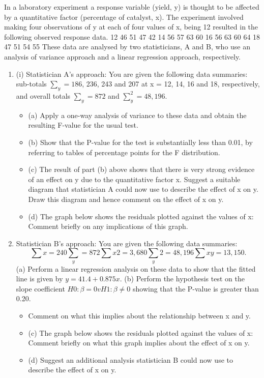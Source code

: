 \documentclass[a4paper,12pt]{article}
\begin{document}

In a laboratory experiment a response variable (yield, y) is thought to be affected by a
quantitative factor (percentage of catalyst, x). The experiment involved making four
observations of y at each of four values of x, being 12%
resulted in the following observed response data.
12%
46
51
47
42
14%
56
57
63
60
16%
56
63
60
64
18%
47
51
54
55
These data are analysed by two statisticians, A and B, who use an analysis of variance
approach and a linear regression approach, respectively.
\begin{enumerate}
\item (i)
Statistician A’s approach:
You are given the following data summaries:
sub-totals $\sum_y = 186$, 236, 243 and 207 at x = 12, 14, 16 and 18,
respectively, and overall totals $\sum_y = 872$ and $\sum_y^2 = 48,196$.
\begin{itemize}
\item (a) Apply a one-way analysis of variance to these data and obtain the
resulting F-value for the usual test.
\item (b) Show that the P-value for the test is substantially less than 0.01, by referring to tables of percentage points for the F distribution.
\item (c) The result of part (b) above shows that there is very strong evidence of
an effect on y due to the quantitative factor x. Suggest a suitable
diagram that statistician A could now use to describe the effect of x on
y. Draw this diagram and hence comment on the effect of x on y.
\item (d) The graph below shows the residuals plotted against the values of x:
Comment briefly on any implications of this graph.
\end{itemize}

\item Statistician B’s approach:
You are given the following data summaries:
\[\sum x = 240 \sum_y = 872 \sum x 2 = 3,680 \sum_y 2 = 48,196 \sum xy = 13,150.\]
(a) Perform a linear regression analysis on these data to show that the
fitted line is given by $y = 41.4 + 0.875x$.
(b) Perform the hypothesis test on the slope coefficient
$H 0 : \beta = 0 v H 1 : \beta \neq 0$
showing that the P-value is greater than 0.20.

\begin{itemize}
    \item Comment on what this implies about the relationship between x and y.

\item (c) The graph below shows the residuals plotted against the values of x:
Comment briefly on what this graph implies about the effect of x on y.
\item (d)
Suggest an additional analysis statistician B could now use to describe
the effect of x on y.
\end{itemize}
\end{enumerate}
\newpage
\end{document}
